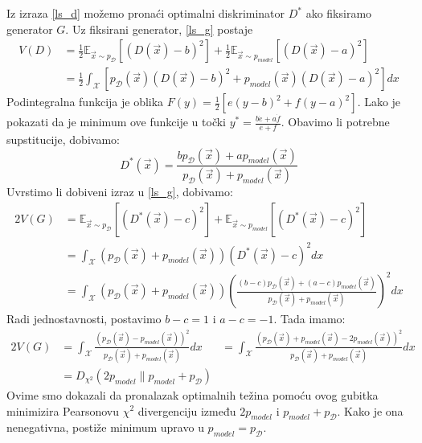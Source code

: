 Iz izraza \ref{ls_d} možemo pronaći optimalni diskriminator $D^*$ ako fiksiramo generator $G$. Uz fiksirani generator, \ref{ls_g} postaje
\begin{align}
V(D) &= \frac{1}{2}\mathbb{E}_{\vec{x} \sim p_{\mathcal{D}}}\left[(D(\vec{x}) - b)^2\right] + \frac{1}{2}\mathbb{E}_{\vec{x} \sim p_{model}}\left[(D(\vec{x}) - a)^2\right] \\
	&= \frac{1}{2} \int_{\mathcal{X}} \left[ p_{\mathcal{D}}(\vec{x})(D(\vec{x}) - b)^2 + p_{model}(\vec{x})(D(\vec{x}) - a)^2\right]dx
\end{align}
Podintegralna funkcija je oblika $F(y) = \frac{1}{2} \left[ e(y - b)^2 + f(y - a)^2\right]$. Lako je pokazati da je minimum ove funkcije u točki $y^* = \frac{b\dot e + a \dot f}{e + f}$. Obavimo li potrebne supstitucije, dobivamo:
\begin{equation}
D^*(\vec{x}) = \frac{bp_{\mathcal{D}}(\vec{x}) + ap_{model}(\vec{x})}{p_{\mathcal{D}}(\vec{x}) + p_{model}(\vec{x})}
\end{equation}
Uvrstimo li dobiveni izraz u \ref{ls_g}, dobivamo:
\begin{align*}
2V(G) &= \mathbb{E}_{\vec{x} \sim p_{\mathcal{D}}}\left[(D^*(\vec{x}) - c)^2\right] + \mathbb{E}_{\vec{x} \sim p_{model}}\left[(D^*(\vec{x}) - c)^2\right] \\
	&= \int_{\mathcal{X}} \left(p_{\mathcal{D}}(\vec{x}) + p_{model}(\vec{x})\right)\left(D^*(\vec{x}) - c\right)^2dx \\
	&= \int_{\mathcal{X}} \left(p_{\mathcal{D}}(\vec{x}) + p_{model}(\vec{x})\right) \left(\frac{(b - c)p_{\mathcal{D}}(\vec{x}) + (a - c)p_{model}(\vec{x})}{p_{\mathcal{D}}(\vec{x}) + p_{model}(\vec{x})}\right)^2 dx
\end{align*}
Radi jednostavnosti, postavimo $b - c = 1$ i $a - c = -1$. Tada imamo:
\begin{align*}
2V(G) &= \int_{\mathcal{X}} \frac{\left(p_{\mathcal{D}}(\vec{x}) - p_{model}(\vec{x})\right)^2}{p_{\mathcal{D}}(\vec{x}) + p_{model}(\vec{x})} dx
	&= \int_{\mathcal{X}} \frac{\left(p_{\mathcal{D}}(\vec{x}) + p_{model}(\vec{x}) - 2p_{model}(\vec{x})\right)^2}{p_{\mathcal{D}}(\vec{x}) + p_{model}(\vec{x})} dx \\
	&= D_{\chi^2}(2p_{model}\|p_{model} + p_{\mathcal{D}})
\end{align*}
Ovime smo dokazali da pronalazak optimalnih težina pomoću ovog gubitka minimizira Pearsonovu $\chi^2$ divergenciju između $2p_{model}$ i $p_{model} + p_{\mathcal{D}}$. Kako je ona nenegativna, postiže minimum upravo u $p_{model} = p_{\mathcal{D}}$.

